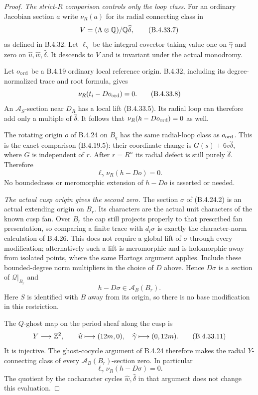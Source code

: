 \begin{proof}
\emph{The strict-$R$ comparison controls only the loop class.}
For an ordinary Jacobian section $a$
write $\nu_R(a)$ for its radial connecting
class in
\[
 V=(\Lambda\otimes\mathbb Q)/\mathbb Q\widehat\delta,
 \tag{B.4.33.7}
\]
as defined in B.4.32. Let $\ell_\gamma$
be the integral covector taking value one
on $\widehat\gamma$ and zero on
$\widehat u,\widehat w,\widehat\delta$.
It descends to $V$ and is invariant under
the actual monodromy.

Let $o_{\rm ord}$ be a B.4.19 ordinary
local reference origin. B.4.32, including
its degree-normalized trace and root
formula, gives
\[
 \nu_R(t_i-D o_{\rm ord})=0.
 \tag{B.4.33.8}
\]
An $\mathcal A_S$-section near $D_R$
has a local lift (B.4.33.5). Its radial
loop can therefore add only a multiple
of $\widehat\delta$. It follows that
$\nu_R(h-D o_{\rm ord})=0$ as well.

The rotating origin $o$ of B.4.24 on
$B_q$ has the same radial-loop class
as $o_{\rm ord}$. This is the exact
comparison (B.4.19.5): their coordinate
change is $G(s)+6v\widehat\delta$,
where $G$ is independent of $r$.
After $r=R^n$ its radial defect is still
purely $\widehat\delta$. Therefore
\[
 \ell_\gamma\nu_R(h-D o)=0.
 \tag{B.4.33.9}
\]
No boundedness or meromorphic extension
of $h-D o$ is asserted or needed.

\emph{The actual cusp origin gives the second zero.}
The section $\sigma$ of (B.4.24.2)
is an actual extending origin on $B_r$.
Its characters are the actual unit
characters of the known cusp fan.
Over $B_r$ the cap still projects properly
to that prescribed fan presentation,
so comparing a finite trace with
$d_i\sigma$ is exactly the character-norm
calculation of B.4.26. This does not
require a global lift of $\sigma$
through every modification; alternatively
such a lift is meromorphic and is
holomorphic away from isolated points,
where the same Hartogs argument applies.
Include these bounded-degree norm
multipliers in the choice of $D$ above.
Hence $D\sigma$ is a
section of $\mathcal Q|_{B_r}$ and
\[
                  h-D\sigma\in
                         \mathcal A_B(B_r).
 \tag{B.4.33.10}
\]
Here $S$ is identified with $B$ away
from its origin, so there is no base
modification in this restriction.

The $Q$-ghost map on the period sheaf
along the cusp is
\[
 Y\longrightarrow\mathbb Z^2,\qquad
 \widehat u\longmapsto(12m,0),\quad
 \widehat\gamma\longmapsto(0,12m).
 \tag{B.4.33.11}
\]
It is injective. The ghost-cocycle
argument of B.4.24 therefore makes the
radial $Y$-connecting class of every
$\mathcal A_B(B_r)$-section zero.
In particular
\[
             \ell_\gamma\nu_R(h-D\sigma)=0.
 \tag{B.4.33.12}
\]
The quotient by the cocharacter cycles
$\widehat w,\widehat\delta$ in that
argument does not change this evaluation.


\end{proof}
